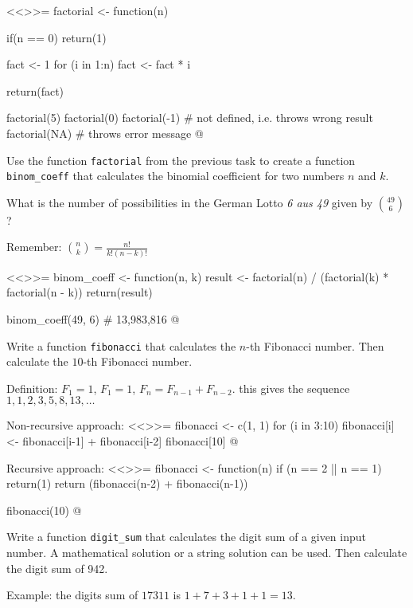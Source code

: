 \documentclass
[answers]
{exercise_sheet}
\begin{document}
\makeatletter\if@answers\begin{Answer}{12}
<<>>=
factorial <- function(n) {
  if(n == 0) {
    return(1)
  }

  fact <- 1
  for (i in 1:n) {
    fact <- fact * i
  }
  
  return(fact)
}

factorial(5)
factorial(0)
factorial(-1) # not defined, i.e. throws wrong result
factorial(NA) # throws error message
@
\end{Answer}\fi\makeatother

\begin{Question}{2}
Use the function \verb|factorial| from the previous task to create a function \verb|binom_coeff| that calculates the binomial coefficient for two numbers $n$ and $k$.

What is the number of possibilities in the German Lotto \emph{6 aus 49} given by $\binom{49}{6}$?

Remember: $\binom{n}{k} = \frac{n!}{k!(n-k)!}$
\end{Question}

\makeatletter\if@answers\begin{Answer}{4}
<<>>=
binom_coeff <- function(n, k) {
  result <- factorial(n) / (factorial(k) * factorial(n - k))
  return(result)
}

binom_coeff(49, 6) # 13,983,816
@
\end{Answer}\fi\makeatother

\begin{Question}{3}
Write a function \verb|fibonacci| that calculates the $n$-th Fibonacci number. Then calculate the $10$-th Fibonacci number.

Definition: $F_1 = 1$, $F_1 = 1$, $F_n = F_{n-1} + F_{n-2}$. this gives the sequence $1, 1, 2, 3, 5, 8, 13, \ldots$
\end{Question}

\makeatletter\if@answers\begin{Answer}{5}
Non-recursive approach:
<<>>=
fibonacci <- c(1, 1)
for (i in 3:10) {
  fibonacci[i] <- fibonacci[i-1] + fibonacci[i-2]
}
fibonacci[10]
@

Recursive approach:
<<>>=
fibonacci <- function(n) {
  if (n == 2 || n == 1) {
    return(1)
  }
  return (fibonacci(n-2) + fibonacci(n-1))
}

fibonacci(10)
@

\end{Answer}\fi\makeatother

\begin{Question}{2}
Write a function \verb|digit_sum| that calculates the digit sum of a given input number. A mathematical solution or a string solution can be used. Then calculate the digit sum of 942.

Example: the digits sum of $17311$ is $1 + 7 + 3 + 1 + 1 = 13$.
\end{Question}
\end{document}
